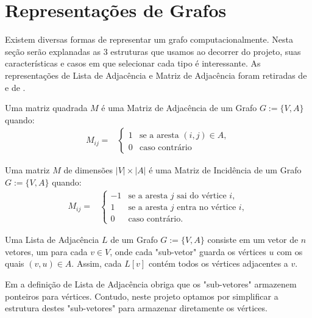 \chapter{Representações de Grafos}
\label{ch:representation} %

Existem diversas formas de representar um grafo computacionalmente. Nesta seção serão explanadas as 3 estruturas que usamos ao decorrer do projeto, suas características e casos em que selecionar cada tipo é interessante.
As representações de Lista de Adjacência e Matriz de Adjacência foram retiradas de \cite{skiena2008algo} e de \cite{cormenEtAl2009algo}.

\begin{mydef}
  Uma matriz quadrada $M$ é uma Matriz de Adjacência de um Grafo $G := \{V, A\}$ quando:
  \begin{align*}
    M_{ij} ={}& \left\{
    \begin{array}{ll}
      1 & \text{se a aresta } (i, j) \in A, \\
      0 & \text{caso contrário}
    \end{array}
    \right.
  \end{align*}
\end{mydef}

\begin{mydef}
  Uma matriz $M$ de dimensões $|V| \times |A|$ é uma Matriz de Incidência de um Grafo $G := \{V, A\}$ quando:
  \begin{align*}
    M_{ij} ={}& \left\{
    \begin{array}{ll}
      -1 & \text{se a aresta } j \text{ sai do vértice } i, \\
      1 & \text{se a aresta } j \text{ entra no vértice } i, \\
      0 & \text{caso contrário}.
    \end{array}
    \right.
  \end{align*}
\end{mydef}

\begin{mydef}
  Uma Lista de Adjacência $L$ de um Grafo $G := \{V, A \}$ consiste em um vetor de $n$ vetores, um para cada $v \in V$, 
  onde cada "sub-vetor" guarda os vértices $u$ com os quais $(v, u) \in A$. 
  Assim, cada $L[v]$ contém todos os vértices adjacentes a $v$. 
\end{mydef}

Em \cite{skiena2008algo} a definição de Lista de Adjacência obriga que os "sub-vetores" armazenem ponteiros para vértices. Contudo, neste projeto optamos por simplificar a estrutura destes "sub-vetores" para armazenar diretamente os vértices. \\


